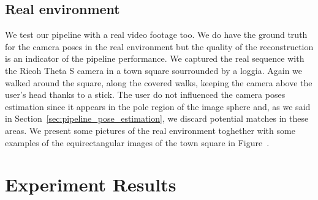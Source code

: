 \subsection{Real environment}
We test our pipeline with a real video footage too. We do have the ground truth
for the camera poses in the real environment but the quality of the
reconstruction is an indicator of the pipeline performance.
We captured the real sequence with the Ricoh Theta S camera in a town square
sourrounded by a loggia. Again we walked around the square, along the covered
walks, keeping the camera above the user's head thanks to a stick.
The user do not influenced the camera poses estimation since it appears in the
pole region of the image sphere and, as we said in
Section~\ref{sec:pipeline_pose_estimation}, we discard potential matches in
these areas.
We present some pictures of the real environment toghether with some examples
of the equirectangular images of the town square in Figure~.
%

\section{Experiment Results}
